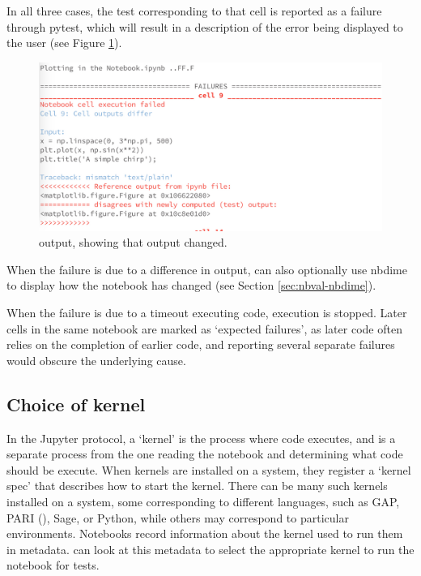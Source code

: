 \documentclass{deliverablereport}
\begin{document}
In all three cases, the test corresponding to that cell is reported as a failure through pytest,
which will result in a description of the error being displayed to the user
(see Figure \ref{fig:nbval}).

\begin{figure}[ht]
  \centering
  \includegraphics[width=1.0\textwidth]{img/nbval-terminal}
  \caption{\nbval output, showing that output changed.}\label{fig:nbval}
\end{figure}

When the failure is due to a difference in output,
\nbval can also optionally use nbdime to display how the notebook has changed
(see Section \ref{sec:nbval-nbdime}).

When the failure is due to a timeout executing code, execution is stopped.
Later cells in the same notebook are marked as `expected failures',
as later code often relies on the completion of earlier code,
and reporting several separate failures would obscure the underlying cause.


\subsection{Choice of kernel}

In the Jupyter protocol, a `kernel' is the process where code executes,
and is a separate process from the one reading the notebook and determining what code should be execute.
When kernels are installed on a system,
they register a `kernel spec' that describes how to start the kernel.
There can be many such kernels installed on a system,
some corresponding to different languages, such as GAP, PARI (), Sage, or Python,
while others may correspond to particular environments.
Notebooks record information about the kernel used to run them in metadata.
\nbval can look at this metadata to select the appropriate kernel to run the notebook for tests.
\end{document}
